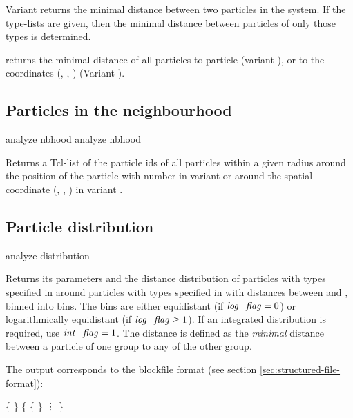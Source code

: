 Variant  returns the minimal distance between two particles
in the system. If the type-lists are given, then the minimal distance
between particles of only those types is determined.

 returns the minimal distance of all particles to
particle  (variant ), or to the coordinates
(, , ) (Variant ).

\subsection{Particles in the neighbourhood}
\label{analyze:nbhood}

\begin{essyntax}
  analyze nbhood  
  analyze nbhood   
\end{essyntax}
Returns a Tcl-list of the particle ids of all particles within a given
radius  around the position of the particle with number
 in variant  or around the spatial coordinate
(, , ) in variant .

\subsection{Particle distribution}
\label{analyze:distribution}

\begin{essyntax}
  analyze distribution  
\end{essyntax}
Returns its parameters and the distance distribution of particles with
types specified in  around particles with
types specified in  with distances between
 and , binned into  bins. The
bins are either equidistant (if $\var{log\_flag} = 0$) or
logarithmically equidistant (if $\var{log\_flag} \geq 1$). If an
integrated distribution is required, use $\var{int\_flag}=1$. The
distance is defined as the \emph{minimal} distance between a particle
of one group to any of the other group.


The output corresponds to the blockfile format (see section
\vref{sec:structured-file-format}):
\begin{code}
\{  \} 
\{ 
  \{   \} 
  \vdots 
\}
\end{code}


